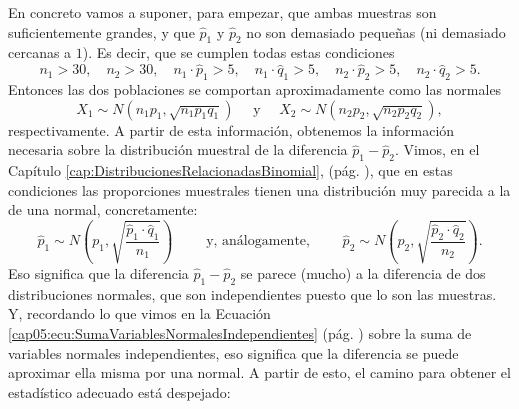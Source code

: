 En concreto vamos a suponer, para empezar, que ambas muestras son suficientemente grandes, y que $\hat p_1$ y $\hat p_2$ no son demasiado pequeñas (ni demasiado cercanas a $1$). Es decir, que se cumplen todas estas condiciones
    \[n_1>30,\quad n_2>30, \quad n_1\cdot\hat p_1>5,\quad n_1\cdot\hat q_1>5,\quad  n_2\cdot\hat p_2>5,\quad n_2\cdot\hat q_2>5.\]
Entonces las dos poblaciones se comportan aproximadamente como las normales
\[X_1\sim N(n_1p_1,\sqrt{n_1p_1q_1})\quad \mbox{ y }\quad X_2\sim N(n_2p_2,\sqrt{n_2p_2q_2}),\]
respectivamente. A partir de esta información, obtenemos la información necesaria sobre la
distribución muestral de la diferencia $\hat p_1-\hat p_2$. Vimos, en el Capítulo
\ref{cap:DistribucionesRelacionadasBinomial}, (pág. \pageref{cap08:ecu:EstadisticoProporciones}),
que en estas condiciones las proporciones muestrales tienen una distribución muy parecida a la de
una normal, concretamente:
    \[\hat p_1\sim N\left(p_1,\sqrt{\dfrac{\hat p_1\cdot\hat q_1}{n_1}}\right)\qquad\mbox{ y, análogamente, }\qquad \hat p_2\sim N\left(p_2,\sqrt{\dfrac{\hat p_2\cdot\hat q_2}{n_2}}\right).\]
Eso significa que la diferencia $\hat p_1-\hat p_2$ se parece (mucho) a la diferencia de dos
distribuciones normales, que son independientes puesto que lo son las muestras. Y, recordando lo
que vimos en la Ecuación \ref{cap05:ecu:SumaVariablesNormalesIndependientes} (pág.
\pageref{cap05:ecu:SumaVariablesNormalesIndependientes}) sobre la suma de variables normales
independientes,  eso significa que la diferencia se puede aproximar ella misma por una normal. A
partir de esto, el camino para obtener el estadístico adecuado está despejado:
